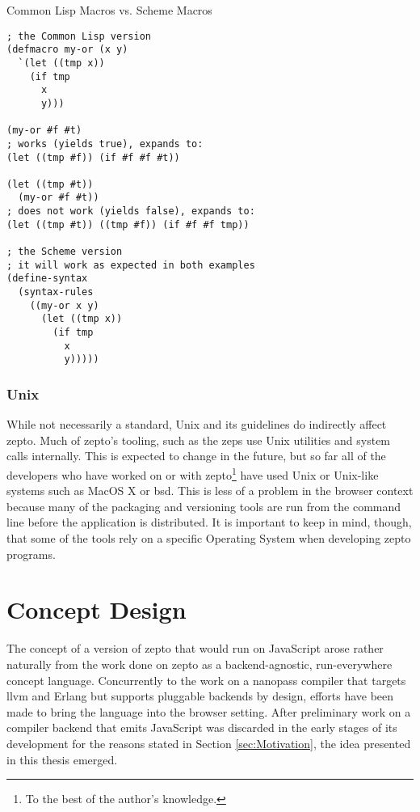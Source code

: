 \documentclass[oneside,11pt,xetex]{scrbook}
\begin{document}
\begin{listing}[H]
\caption{Common Lisp Macros vs. Scheme Macros}
\begin{verbatim}
; the Common Lisp version
(defmacro my-or (x y)
  `(let ((tmp x))
    (if tmp
      x
      y)))

(my-or #f #t)
; works (yields true), expands to:
(let ((tmp #f)) (if #f #f #t))

(let ((tmp #t))
  (my-or #f #t))
; does not work (yields false), expands to:
(let ((tmp #t)) ((tmp #f)) (if #f #f tmp))

; the Scheme version
; it will work as expected in both examples
(define-syntax
  (syntax-rules
    ((my-or x y)
      (let ((tmp x))
        (if tmp
          x
          y)))))
\end{verbatim}
\label{fig:schemevscomlisp}
\end{listing}

\subsection{Unix}

While not necessarily a standard, Unix and its guidelines do indirectly affect zepto. Much of zepto's
tooling, such as the \gls{zeps} use Unix utilities and system calls internally. This is expected to change
in the future, but so far all of the developers who have worked on or with zepto\footnote{To the
best of the author's knowledge.} have used Unix or Unix-like systems such as MacOS X or \gls{bsd}.
This is less of a problem in the browser context because many of the packaging and versioning
tools are run from the command line before the application is distributed. It is important to
keep in mind, though, that some of the tools rely on a specific Operating System when
developing zepto programs.

\chapter{Concept Design}
\label{chap:ConceptDesign}

The concept of a version of zepto that would run on JavaScript arose rather
naturally from the work done on zepto as a backend-agnostic, run-everywhere
concept language. Concurrently to the work on a nanopass compiler that
targets \gls{llvm} and Erlang but supports pluggable backends by design, efforts
have been made to bring the language into the browser setting. After preliminary
work on a compiler backend that emits JavaScript was discarded in the
early stages of its development for the reasons stated in Section \ref{sec:Motivation},
the idea presented in this thesis emerged.
\end{document}

